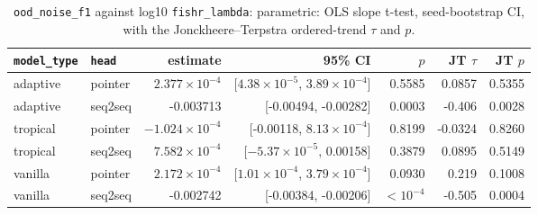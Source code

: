 \documentclass[10pt]{article}
\begin{document}
{\small
\begin{longtable}{llrrrrr}
\caption{\texttt{ood\_noise\_f1} against log10 \texttt{fishr\_lambda}: parametric: OLS slope t-test, seed-bootstrap CI, with the Jonckheere--Terpstra ordered-trend $\tau$ and $p$.}\label{tab:trend-ood_noise_f1}\\
\toprule
\texttt{model\_type} & \texttt{head} & estimate & 95\% CI & $p$ & JT $\tau$ & JT $p$\\
\midrule
\endhead
adaptive & pointer & $2.377\times10^{-4}$ & [$4.38\times10^{-5}$, $3.89\times10^{-4}$] & 0.5585 & 0.0857 & 0.5355\\
adaptive & seq2seq & -0.003713 & [-0.00494, -0.00282] & 0.0003 & -0.406 & 0.0028\\
tropical & pointer & $-1.024\times10^{-4}$ & [-0.00118, $8.13\times10^{-4}$] & 0.8199 & -0.0324 & 0.8260\\
tropical & seq2seq & $7.582\times10^{-4}$ & [$-5.37\times10^{-5}$, 0.00158] & 0.3879 & 0.0895 & 0.5149\\
vanilla & pointer & $2.172\times10^{-4}$ & [$1.01\times10^{-4}$, $3.79\times10^{-4}$] & 0.0930 & 0.219 & 0.1008\\
vanilla & seq2seq & -0.002742 & [-0.00384, -0.00206] & $<10^{-4}$ & -0.505 & 0.0004\\
\bottomrule
\end{longtable}
}
\end{document}
